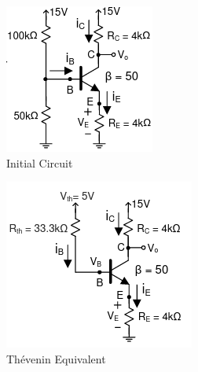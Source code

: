 \documentclass[12pt]{article}
\begin{document}
  \begin{multicols}{2}

    \begin{figure}[H]
      \centering
      \includegraphics[width=.44\textwidth]{Figures/Four-Resista}
      \caption{Initial Circuit}
      \label{fig:7}
    \end{figure}

    \begin{figure}[H]
      \centering
      \includegraphics[width=.44\textwidth]{Figures/Four-Resistb}
      \caption{Th\'evenin Equivalent}
      \label{fig:8}
    \end{figure}

  \end{multicols}
\end{document}
